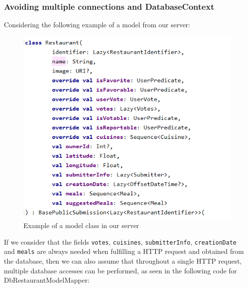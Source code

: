 \subsubsection{Avoiding multiple connections and DatabaseContext}

Considering the following example of a model from our server:\\

\begin{figure}[H]
    \begin{center}
        \includegraphics[scale=0.8]{_figures/img 1 - Example of a model class in our server.png}
        \caption{Example of a model class in our server}
    \end{center}
\end{figure}

If we consider that the fields \texttt{votes}, \texttt{cuisines}, \texttt{submitterInfo}, \texttt{creationDate} and \texttt{meals} are 
always needed when fulfilling a HTTP request and obtained from the database, then we can also assume that throughout a single HTTP request,
multiple database accesses can be performed, as seen in the following code for DbRestaurantModelMapper:\\

